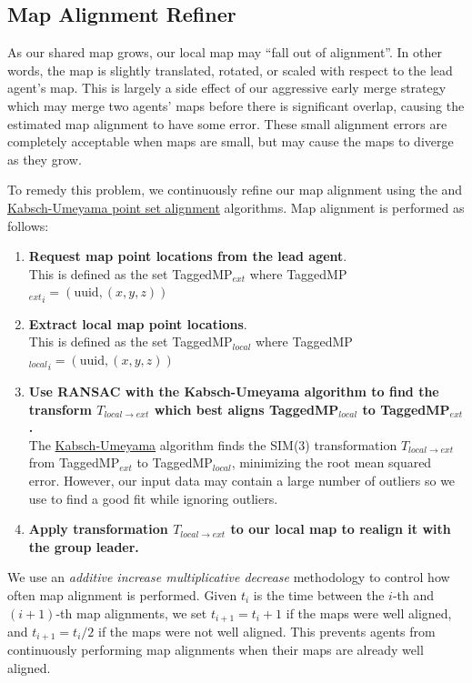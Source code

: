 \subsection{Map Alignment Refiner}
\label{sec:map-alignment-refiner}
As our shared map grows, our local map may ``fall out of alignment''. In other words, the map is slightly translated, rotated, or scaled with respect to the lead agent's map. This is largely a side effect of our aggressive early merge strategy which may merge two agents' maps before there is significant overlap, causing the estimated map alignment to have some error. These small alignment errors are completely acceptable when maps are small, but may cause the maps to diverge as they grow.

To remedy this problem, we continuously refine our map alignment using the  and \hyperref[sec:kabsch-umeyama-algorithm]{Kabsch-Umeyama point set alignment} algorithms. Map alignment is performed as follows:

\begin{enumerate}
    \item \textbf{Request map point locations from the lead agent}. \\
          This is defined as the set TaggedMP$_{ext}$ where TaggedMP${_{ext}}_i = (\text{uuid}, (x, y, z))$
    \item \textbf{Extract local map point locations}. \\
          This is defined as the set TaggedMP$_{local}$ where TaggedMP${_{local}}_i = (\text{uuid}, (x, y, z))$
    \item \textbf{Use RANSAC with the Kabsch-Umeyama algorithm to find the transform $T_{local \to ext}$ which best aligns TaggedMP$_{local}$ to TaggedMP$_{ext}$.} \\
          The \hyperref[sec:kabsch-umeyama-algorithm]{Kabsch-Umeyama} algorithm finds the SIM(3) transformation $T_{local \to ext}$ from TaggedMP$_{ext}$ to TaggedMP$_{local}$, minimizing the root mean squared error. However, our input data may contain a large number of outliers so we use  to find a good fit while ignoring outliers.
    \item \textbf{Apply transformation $T_{local \to ext}$ to our local map to realign it with the group leader.}
\end{enumerate}

We use an \textit{additive increase multiplicative decrease} methodology to control how often map alignment is performed. Given $t_i$ is the time between the $i$-th and $(i+1)$-th map alignments, we set $t_{i+1} = t_i + 1$ if the maps were well aligned, and $t_{i+1} = t_i / 2$ if the maps were not well aligned. This prevents agents from continuously performing map alignments when their maps are already well aligned.

